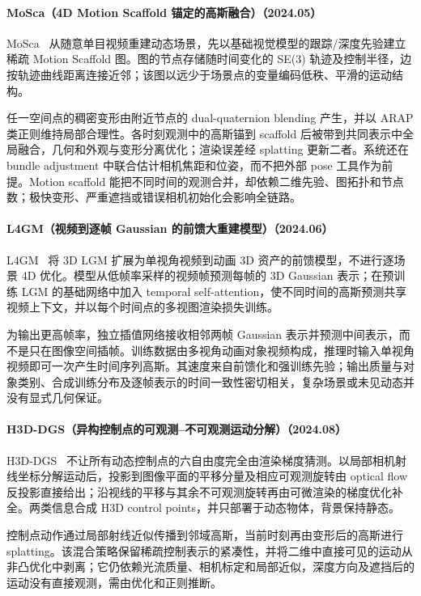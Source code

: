 \paragraph{MoSca（4D Motion Scaffold 锚定的高斯融合）（2024.05）}
MoSca~\cite{2405_17421} 从随意单目视频重建动态场景，先以基础视觉模型的跟踪/深度先验建立稀疏 Motion Scaffold 图。图的节点存储随时间变化的 SE(3) 轨迹及控制半径，边按轨迹曲线距离连接近邻；该图以远少于场景点的变量编码低秩、平滑的运动结构。

任一空间点的稠密变形由附近节点的 dual-quaternion blending 产生，并以 ARAP 类正则维持局部合理性。各时刻观测中的高斯锚到 scaffold 后被带到共同表示中全局融合，几何和外观与变形分离优化；渲染误差经 splatting 更新二者。系统还在 bundle adjustment 中联合估计相机焦距和位姿，而不把外部 pose 工具作为前提。Motion scaffold 能把不同时间的观测合并，却依赖二维先验、图拓扑和节点数；极快变形、严重遮挡或错误相机初始化会影响全链路。

\paragraph{L4GM（视频到逐帧 Gaussian 的前馈大重建模型）（2024.06）}
L4GM~\cite{2406_10324} 将 3D LGM 扩展为单视角视频到动画 3D 资产的前馈模型，不进行逐场景 4D 优化。模型从低帧率采样的视频帧预测每帧的 3D Gaussian 表示；在预训练 LGM 的基础网络中加入 temporal self-attention，使不同时间的高斯预测共享视频上下文，并以每个时间点的多视图渲染损失训练。

为输出更高帧率，独立插值网络接收相邻两帧 Gaussian 表示并预测中间表示，而不是只在图像空间插帧。训练数据由多视角动画对象视频构成，推理时输入单视角视频即可一次产生时间序列高斯。其速度来自前馈化和强训练先验；输出质量与对象类别、合成训练分布及逐帧表示的时间一致性密切相关，复杂场景或未见动态并没有显式几何保证。

\paragraph{H3D-DGS（异构控制点的可观测--不可观测运动分解）（2024.08）}
H3D-DGS~\cite{2408_13036} 不让所有动态控制点的六自由度完全由渲染梯度猜测。以局部相机射线坐标分解运动后，投影到图像平面的平移分量及相应可观测旋转由 optical flow 反投影直接给出；沿视线的平移与其余不可观测旋转再由可微渲染的梯度优化补全。两类信息合成 H3D control points，并只部署于动态物体，背景保持静态。

控制点动作通过局部射线近似传播到邻域高斯，当前时刻再由变形后的高斯进行 splatting。该混合策略保留稀疏控制表示的紧凑性，并将二维中直接可见的运动从非凸优化中剥离；它仍依赖光流质量、相机标定和局部近似，深度方向及遮挡后的运动没有直接观测，需由优化和正则推断。

